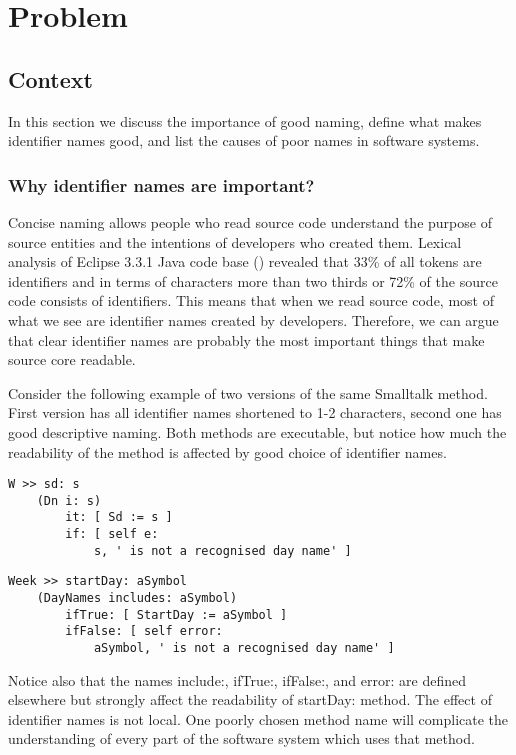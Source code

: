 \chapter{Problem}
\label{chap:Problem}
\mtoc

\section{Context}

In this section we discuss the importance of good naming, define what makes identifier names good, and list the causes of poor names in software systems.

\subsection{Why identifier names are important?}

 Concise naming allows people who read source code understand the purpose of source entities and the intentions of developers who created them. Lexical analysis of Eclipse 3.3.1 Java code base (\cite{Deis06}) revealed that 33\% of all tokens are identifiers and in terms of characters more than two thirds or 72\% of the source code consists of identifiers. This means that when we read source code, most of what we see are identifier names created by developers. Therefore, we can argue that clear identifier names are probably the most important things that make source core readable.

Consider the following example of two versions of the same Smalltalk method. First version has all identifier names shortened to 1-2 characters, second one has good descriptive naming. Both methods are executable, but notice how much the readability of the method is affected by good choice of identifier names.

\begin{lstlisting}
W >> sd: s
    (Dn i: s)
        it: [ Sd := s ]
        if: [ self e:
            s, ' is not a recognised day name' ]
\end{lstlisting}

\begin{lstlisting}
Week >> startDay: aSymbol
    (DayNames includes: aSymbol)
        ifTrue: [ StartDay := aSymbol ]
        ifFalse: [ self error:
            aSymbol, ' is not a recognised day name' ]
\end{lstlisting}

Notice also that the names include:, ifTrue:, ifFalse:, and error: are defined elsewhere but strongly affect the readability of startDay: method. The effect of identifier names is not local. One poorly chosen method name will complicate the understanding of every part of the software system which uses that method.

